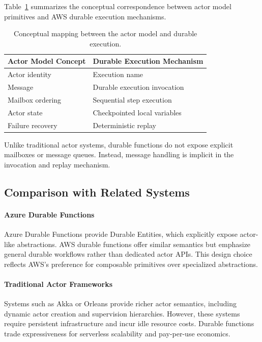 Table~\ref{tab:actor-mapping} summarizes the conceptual correspondence between actor model primitives and AWS durable execution mechanisms.

\begin{table}[t]
\centering
\begin{tabular}{ll}
\hline
Actor Model Concept & Durable Execution Mechanism \\
\hline
Actor identity & Execution name \\
Message & Durable execution invocation \\
Mailbox ordering & Sequential step execution \\
Actor state & Checkpointed local variables \\
Failure recovery & Deterministic replay \\
\hline
\end{tabular}
\caption{Conceptual mapping between the actor model and durable execution.}
\label{tab:actor-mapping}
\end{table}

Unlike traditional actor systems, durable functions do not expose explicit mailboxes or message queues. Instead, message handling is implicit in the invocation and replay mechanism.

\subsection{Comparison with Related Systems}

\paragraph{Azure Durable Functions}
Azure Durable Functions provide Durable Entities, which explicitly expose actor-like abstractions. AWS durable functions offer similar semantics but emphasize general durable workflows rather than dedicated actor APIs. This design choice reflects AWS's preference for composable primitives over specialized abstractions.

\paragraph{Traditional Actor Frameworks}
Systems such as Akka or Orleans provide richer actor semantics, including dynamic actor creation and supervision hierarchies. However, these systems require persistent infrastructure and incur idle resource costs. Durable functions trade expressiveness for serverless scalability and pay-per-use economics.


